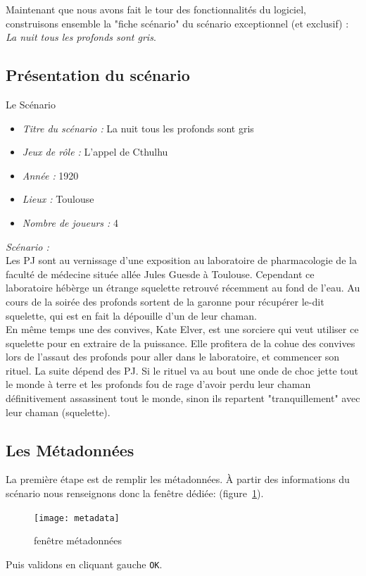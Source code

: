 \documentclass[a4paper,12pt]{article}
\newcommand*{\interfaceitem}[1]{\texttt{#1}}
\begin{document}
Maintenant que nous avons fait le tour des fonctionnalités du logiciel, construisons ensemble la "fiche scénario" du scénario exceptionnel (et exclusif) : \emph{La nuit tous les profonds sont gris}.

\subsection{Présentation du scénario}
\label{exemple_scenario}
Le Scénario
\begin{itemize}
    \item \emph{Titre du scénario :} La nuit tous les profonds sont gris
    \item \emph{Jeux de rôle :} L'appel de Cthulhu
    \item \emph{Année :} 1920
    \item \emph{Lieux :} Toulouse
    \item \emph{Nombre de joueurs : } 4
\end{itemize}

\emph{Scénario :}\\ 
Les PJ sont au vernissage d'une exposition au laboratoire de pharmacologie de la faculté de médecine située allée Jules Guesde à Toulouse. Cependant ce laboratoire hébèrge  un étrange squelette retrouvé récemment au fond de l'eau. Au cours de la soirée des profonds sortent de la garonne pour récupérer le-dit squelette, qui est en fait la dépouille d'un de leur chaman.
\\
En même temps une des convives, Kate Elver, est une sorciere qui veut utiliser ce squelette pour en extraire de la puissance. Elle profitera de la cohue des convives lors de l'assaut des profonds pour aller dans le laboratoire, et commencer son rituel. La suite dépend des PJ. Si le rituel va au bout une onde de choc jette tout le monde à terre et les profonds fou de rage d'avoir perdu leur chaman définitivement assassinent tout le monde, sinon ils repartent "tranquillement" avec leur chaman (squelette).

\subsection{Les Métadonnées}
La première étape est de remplir les métadonnées. À partir des informations du scénario nous renseignons donc la fenêtre dédiée: (figure~\ref{metadata}).
\begin{figure}[h!]
    \texttt{[image: metadata]}
    \caption{fenêtre métadonnées}
    \label{metadata}
\end{figure}
Puis validons en cliquant gauche \interfaceitem{OK}.
\end{document}
